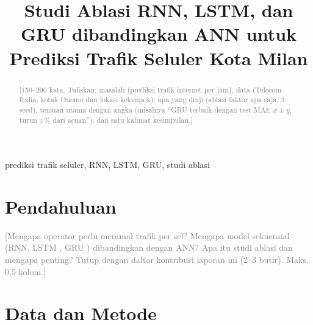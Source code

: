 \documentclass[conference,a4paper]{IEEEtran}
\newcommand{\petunjuk}[1]{\textcolor{gray}{[#1]}}
\begin{document}
\title{Studi Ablasi RNN, LSTM, dan GRU dibandingkan ANN untuk Prediksi Trafik Seluler Kota Milan}

\author{
\and
{}
\and
{}
}

\maketitle

\begin{abstract}
\petunjuk{150--200 kata. Tuliskan: masalah (prediksi trafik internet per jam), data (Telecom Italia, kotak Duomo dan lokasi kelompok), apa yang diuji (ablasi faktor apa saja, 3 seed), temuan utama dengan angka (misalnya ``GRU terbaik dengan test MAE $x \pm y$, turun $z$\,\% dari acuan''), dan satu kalimat kesimpulan.}
\end{abstract}

\begin{IEEEkeywords}
prediksi trafik seluler, RNN, LSTM, GRU, studi ablasi
\end{IEEEkeywords}

\section{Pendahuluan}
\petunjuk{Mengapa operator perlu meramal trafik per sel? Mengapa model sekuensial (RNN, LSTM \cite{hochreiter1997lstm}, GRU \cite{cho2014gru}) dibandingkan dengan ANN? Apa itu studi ablasi dan mengapa penting? Tutup dengan daftar kontribusi laporan ini (2--3 butir). Maks. 0,5 kolom.}

\section{Data dan Metode}
\end{document}
